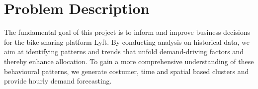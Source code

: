 \section{Problem Description}

The fundamental goal of this project is to inform and improve business decisions for the bike-sharing platform Lyft. By conducting analysis on historical data, we aim at identifying patterns and trends that unfold demand-driving factors and thereby enhance allocation. To gain a more comprehensive understanding of these behavioural patterns, we generate costumer, time and spatial based clusters and provide hourly demand forecasting.